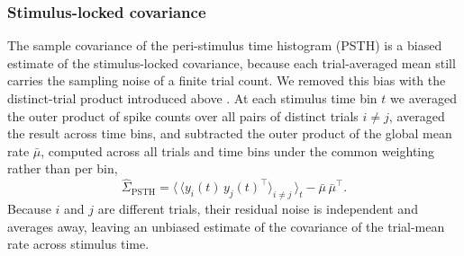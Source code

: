 \documentclass{lite}
\begin{document}
\subsubsection{Stimulus-locked covariance}
The sample covariance of the peri-stimulus time histogram (PSTH) is a biased estimate of the stimulus-locked covariance, because each trial-averaged mean still carries the sampling noise of a finite trial count. We removed this bias with the distinct-trial product introduced above \cite{sahani2003linear}. At each stimulus time bin $t$ we averaged the outer product of spike counts over all pairs of distinct trials $i \neq j$, averaged the result across time bins, and subtracted the outer product of the global mean rate $\bar{\mu}$, computed across all trials and time bins under the common weighting rather than per bin,
\begin{equation}
    \hat{\Sigma}_{\text{PSTH}} = \big\langle\, \langle y_{i}(t)\, y_{j}(t)^\top \rangle_{i \neq j} \,\big\rangle_{t} - \bar{\mu}\,\bar{\mu}^\top.
\end{equation}
Because $i$ and $j$ are different trials, their residual noise is independent and averages away, leaving an unbiased estimate of the covariance of the trial-mean rate across stimulus time.
\end{document}
